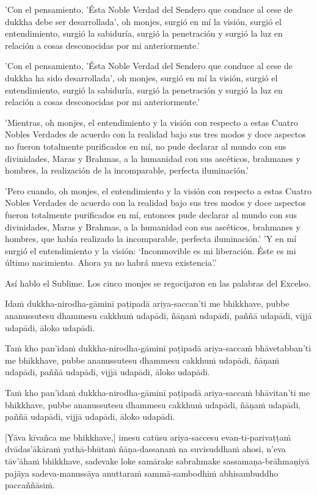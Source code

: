 'Con el pensamiento, 'Ésta Noble Verdad del Sendero que conduce al cese de dukkha debe ser desarrollada', oh monjes, surgió en mí la visión, surgió el entendimiento, surgió la sabiduría, surgió la penetración y surgió la luz en relación a cosas desconocidas por mi anteriormente.'

'Con el pensamiento, 'Ésta Noble Verdad del Sendero que conduce al cese de dukkha ha sido desarrollada', oh monjes, surgió en mí la visión, surgió el entendimiento, surgió la sabiduría, surgió la penetración y surgió la luz en relación a cosas desconocidas por mi anteriormente.'

'Mientras, oh monjes, el entendimiento y la visión con respecto a estas Cuatro Nobles Verdades de acuerdo con la realidad bajo sus tres modos y doce aspectos no fueron totalmente purificados en mí, no pude declarar al mundo con sus divinidades, Maras y Brahmas, a la humanidad con sus ascéticos, brahmanes y hombres, la realización de la incomparable, perfecta iluminación.'

'Pero cuando, oh monjes, el entendimiento y la visión con respecto a estas Cuatro Nobles Verdades de acuerdo con la realidad bajo sus tres modos y doce aspectos fueron totalmente purificados en mí, entonces pude declarar al mundo con sus divinidades, Maras y Brahmas, a la humanidad con sus ascéticos, brahmanes y hombres, que había realizado la incomparable, perfecta iluminación.'
'Y en mí surgió el entendimiento y la visión: ‘Inconmovible es mi liberación. Éste es mi último nacimiento. Ahora ya no habrá nueva existencia’.'

Así hablo el Sublime. Los cinco monjes se regocijaron en las palabras del Excelso.


\clearpage

\paliText
\markboth{\paliTitle}{\rightmark}

Idaṁ dukkha-nirodha-gāminī paṭipadā ariya-saccan'ti me bhikkhave, pubbe
ananussutesu dhammesu cakkhuṁ udapādi, ñāṇaṁ udapādi, paññā udapādi,
vijjā udapādi, āloko udapādi.

Taṁ kho pan'idaṁ dukkha-nirodha-gāminī paṭipadā ariya-saccaṁ bhāvetabban'ti
me bhikkhave, pubbe ananussutesu dhammesu cakkhuṁ udapādi, ñāṇaṁ
udapādi, paññā udapādi, vijjā udapādi, āloko udapādi.

Taṁ kho pan'idaṁ dukkha-nirodha-gāminī paṭipadā ariya-saccaṁ bhāvitan'ti me
bhikkhave, pubbe ananussutesu dhammesu cakkhuṁ udapādi, ñāṇaṁ udapādi,
paññā udapādi, vijjā udapādi, āloko udapādi.

[Yāva kīvañca me bhikkhave,] imesu catūsu ariya-saccesu evan-ti-parivaṭṭaṁ
dvādas'ākāraṁ yathā-bhūtaṁ ñāṇa-dassanaṁ na suvisuddhaṁ ahosi, n'eva tāv'āhaṁ
bhikkhave, sadevake loke samārake sabrahmake sassamaṇa-brāhmaṇiyā pajāya
sadeva-manussāya anuttaraṁ sammā-sambodhiṁ abhisambuddho paccaññāsiṁ.

